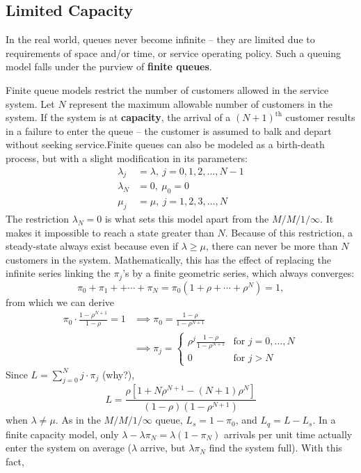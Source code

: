 \subsection{Limited Capacity}
In the real world, queues never become infinite -- they are limited due to requirements of {space} and/or {time}, or service operating policy. Such a queuing model falls under the purview of \textbf{finite queues}. \par Finite queue models restrict the number of customers allowed in the service system. Let $N$ represent the maximum allowable number of customers in the system. If the system is at \textbf{capacity}, the arrival of a $(N+1)^{\textrm{th}}$ customer results in a failure to enter the queue -- the customer is assumed to balk and depart without seeking service.\newl Finite queues can also be modeled as a birth-death process, but with a slight modification in its parameters: 
\begin{align*}
\lambda_{j} &= \lambda, \ j=0,1,2,\ldots,N-1 \\ 
\lambda_{N} &= 0,\ \mu_{0} = 0 \\
\mu_{j} &= \mu,\  j=1,2,3,\ldots, N 
\end{align*}
The restriction $\lambda_{N} = 0$ is what sets this model apart from the $M/M/1/\infty$. It makes it impossible to reach a state greater than $N$. Because of this restriction, a steady-state always exist because even if $\lambda \geq \mu$, there can never be more than $N$ customers in the system.
\newl Mathematically, this has the effect of replacing the infinite series linking the $\pi_j$'s by a finite geometric series, which always converges: 
$$ \pi_{0}+\pi_1 + +\cdots + \pi_N = \pi_0(1+\rho+\cdots +\rho^{N}) = 1,$$ from which we can derive \begin{align*}\pi_{0}\cdot \frac{1-\rho^{N+1}}{1-\rho} = 1 &\implies \pi_0 = \frac{1-\rho}{1-\rho^{N+1}} \\ &\implies \pi_{j} = \begin{cases}\rho^{j} \frac{1-\rho}{1-\rho^{N+1}} & \text{for $j=0,\ldots,N$} \\ 0 & \text{for $j>N$}\end{cases}\end{align*}
Since $L = \sum^{N}_{j=0} j\cdot \pi_{j}$ (why?), 
$$L = \frac{\rho [1+ N \rho^{N+1} - (N+1) \rho^{N} ]}{(1-\rho)\left(1-\rho^{N+1}\right)} $$
when $\lambda\neq\mu$. \newl As in the $M/M/1/\infty$ queue, $L_{s} = 1 - \pi_{0}$, and $L_{q} = L - L_{s}$.  \newpage\noindent In a finite capacity model, only $\lambda - \lambda \pi_{N} = \lambda\left(1-\pi_{N}\right)$ arrivals per unit time  actually enter the system on average ($\lambda$ arrive, but $\lambda\pi_N$ find the system full). With this fact, 
